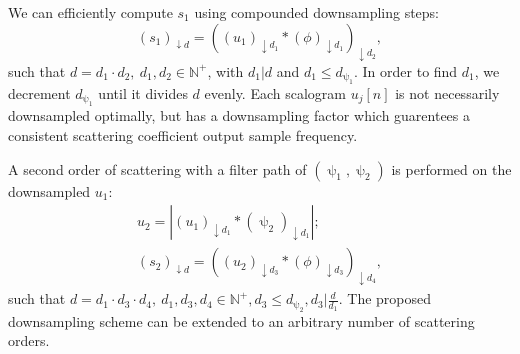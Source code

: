 \documentclass[journal]{IEEEtran}
\begin{document}
We can efficiently compute $s_1$ using compounded downsampling steps:
\begin{equation}
    \left(s_1\right)_{\downarrow d} = \left( \left(u_1\right)_{\downarrow d_1} * (\phi)_{\downarrow d_1}\right)_{\downarrow d_2},
\end{equation}
such that $d = d_1 \cdot d_2, \ d_1, d_2 \in \mathbb{N}^+$, with $d_1 | d$ and $d_1 \le  d_{\uppsi_1}$. In order to find $d_1$, we decrement $d_{\uppsi_1}$ until it divides $d$ evenly. Each scalogram $u_j[n]$ is not necessarily downsampled optimally, but has a downsampling factor which guarentees a consistent scattering coefficient output sample frequency. 


A second order of scattering with a filter path of $(\uppsi_1, \uppsi_2)$ is performed on the downsampled $u_1$:
\begin{gather}
    u_2 = \left|  \left(u_1\right)_{\downarrow d_1} * (\uppsi_2)_{\downarrow d_1}  \right|; \\
    \left(s_2\right)_{\downarrow d} = \left( \left(u_2\right)_{\downarrow d_3} * (\phi)_{\downarrow d_3}\right)_{\downarrow d_4},
\end{gather}
such that $d = d_1 \cdot d_3 \cdot d_4, \ d_1, d_3, d_4 \in \mathbb{N}^+, d_3 \le d_{\uppsi_2}, d_3 | \frac{d}{d_1}$. The proposed downsampling scheme can be extended to an arbitrary number of scattering orders.

\end{document}
